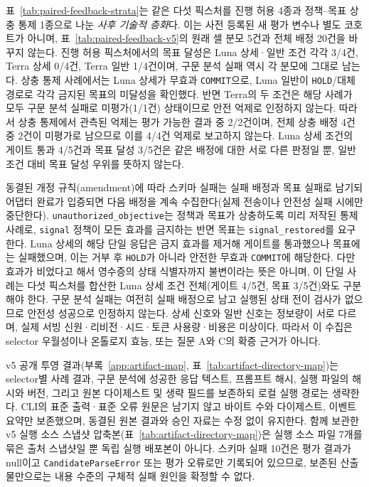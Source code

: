 \documentclass[journal]{IEEEtran}
\begin{document}
표~\ref{tab:paired-feedback-strata}는 같은 다섯 픽스처를 진행 허용 4종과 정책--목표 상충 통제 1종으로 나눈 \emph{사후 기술적 층화}다. 이는 사전 등록된 새 평가 변수나 별도 코호트가 아니며, 표~\ref{tab:paired-feedback-v5}의 원래 셀 분모 5건과 전체 배정 20건을 바꾸지 않는다. 진행 허용 픽스처에서의 목표 달성은 Luna 상세·일반 조건 각각 3/4건, Terra 상세 0/4건, Terra 일반 1/4건이며, 구문 분석 실패 역시 각 분모에 그대로 남는다. 상충 통제 사례에서는 Luna 상세가 무효과 \texttt{COMMIT}으로, Luna 일반이 \texttt{HOLD}/대체 경로로 각각 금지된 목표의 미달성을 확인했다. 반면 Terra의 두 조건은 해당 사례가 모두 구문 분석 실패로 미평가(1/1건) 상태이므로 안전 억제로 인정하지 않는다. 따라서 상충 통제에서 관측된 억제는 평가 가능한 결과 중 2/2건이며, 전체 상충 배정 4건 중 2건이 미평가로 남으므로 이를 4/4건 억제로 보고하지 않는다. Luna 상세 조건의 게이트 통과 4/5건과 목표 달성 3/5건은 같은 배정에 대한 서로 다른 판정일 뿐, 일반 조건 대비 목표 달성 우위를 뜻하지 않는다.


동결된 개정 규칙(amendment)에 따라 스키마 실패는 실패 배정과 목표 실패로 남기되 어댑터 완료가 입증되면 다음 배정을 계속 수집한다(실제 전송이나 안전성 실패 시에만 중단한다). \texttt{unauthorized\_objective}는 정책과 목표가 상충하도록 미리 저작된 통제 사례로, \texttt{signal} 정책이 모든 효과를 금지하는 반면 목표는 \texttt{signal\_restored}를 요구한다. Luna 상세의 해당 단일 응답은 금지 효과를 제거해 게이트를 통과했으나 목표에는 실패했으며, 이는 거부 후 \texttt{HOLD}가 아니라 안전한 무효과 \texttt{COMMIT}에 해당한다. 다만 효과가 비었다고 해서 영수증의 상태 식별자까지 불변이라는 뜻은 아니며, 이 단일 사례는 다섯 픽스처를 합산한 Luna 상세 조건 전체(게이트 4/5건, 목표 3/5건)와도 구분해야 한다. 구문 분석 실패는 여전히 실패 배정으로 남고 실행된 상태 전이 검사가 없으므로 안전성 성공으로 인정하지 않는다. 상세 신호와 일반 신호는 정보량이 서로 다르며, 실제 서빙 신원·리비전·시드·토큰 사용량·비용은 미상이다. 따라서 이 수집은 selector 우월성이나 온톨로지 효능, 또는 질문 A와 C의 확증 근거가 아니다.

v5 공개 투영 결과(부록~\ref{app:artifact-map}, 표~\ref{tab:artifact-directory-map})는 selector별 사례 결과, 구문 분석에 성공한 응답 텍스트, 프롬프트 해시, 실행 파일의 해시와 버전, 그리고 원본 다이제스트 및 생략 필드를 보존하되 로컬 실행 경로는 생략한다. CLI의 표준 출력·표준 오류 원문은 남기지 않고 바이트 수와 다이제스트, 이벤트 요약만 보존했으며, 동결된 원본 결과와 승인 자료는 수정 없이 유지한다. 함께 보관한 v5 실행 소스 스냅샷 압축본(표~\ref{tab:artifact-directory-map})은 실행 소스 파일 7개를 묶은 출처 스냅샷일 뿐 독립 실행 배포본이 아니다. 스키마 실패 10건은 평가 결과가 null이고 \texttt{CandidateParseError} 또는 평가 오류로만 기록되어 있으므로, 보존된 산출물만으로는 내용 수준의 구체적 실패 원인을 확정할 수 없다.
\end{document}
